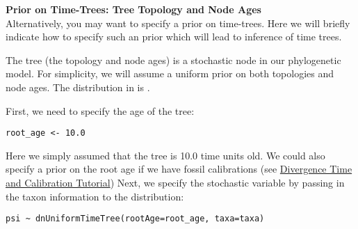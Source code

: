 \begin{framed}
\textbf{Prior on Time-Trees: Tree Topology and Node Ages}\\

Alternatively, you may want to specify a prior on time-trees.
Here we will briefly indicate how to specify such an prior which will lead to inference of time trees.

The tree (the topology and node ages) is a stochastic node in our phylogenetic model. 
For simplicity, we will assume a uniform prior on both topologies and node ages.
The distribution in \RevBayes is . 


First, we need to specify the age of the tree:
{\tt \begin{snugshade*}
\begin{lstlisting}
root_age <- 10.0
\end{lstlisting}
\end{snugshade*}}
Here we simply assumed that the tree is 10.0 time units old. 
We could also specify a prior on the root age if we have fossil calibrations (see \href{https://github.com/revbayes/revbayes_tutorial/raw/master/tutorial_TeX/RB_DivergenceTime_Calibration_Tutorial/RB_DivergenceTime_Calibration_Tutorial.pdf}{Divergence Time and Calibration Tutorial})
Next, we specify the  stochastic variable by passing in the taxon information  to the  distribution:
{\tt \begin{snugshade*}
\begin{lstlisting}
psi ~ dnUniformTimeTree(rootAge=root_age, taxa=taxa)
\end{lstlisting}
\end{snugshade*}}


\end{framed}
